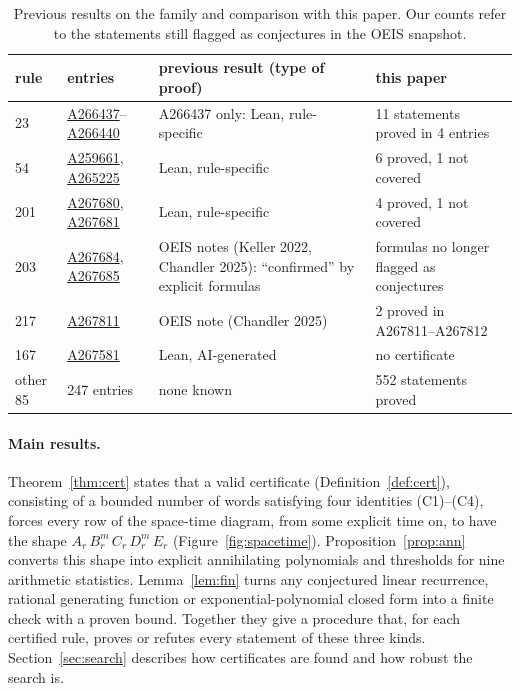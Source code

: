 \documentclass[11pt]{article}
\theoremstyle{definition}
\theoremstyle{remark}
\newcommand{\oeis}[1]{\href{https://oeis.org/#1}{#1}}
\begin{document}
\begin{table}[ht]\centering\small
\begin{tabular}{p{1.1cm}p{3.1cm}p{5.2cm}p{4.6cm}}\toprule
rule & entries & previous result (type of proof) & this paper\\\midrule
23 & \oeis{A266437}--\oeis{A266440} & A266437 only: Lean, rule-specific~\cite{blair} & 11 statements proved in 4 entries\\
54 & \oeis{A259661}, \oeis{A265225} & Lean, rule-specific~\cite{omega54} & 6 proved, 1 not covered\\
201 & \oeis{A267680}, \oeis{A267681} & Lean, rule-specific~\cite{omega} & 4 proved, 1 not covered\\
203 & \oeis{A267684}, \oeis{A267685} & OEIS notes (Keller 2022, Chandler 2025): ``confirmed'' by explicit formulas & formulas no longer flagged as conjectures\\
217 & \oeis{A267811} & OEIS note (Chandler 2025) & 2 proved in A267811--A267812\\
167 & \oeis{A267581} & Lean, AI-generated~\cite{adamczewski} & no certificate\\
other 85 & 247 entries & none known & 552 statements proved\\\bottomrule
\end{tabular}
\caption{Previous results on the family and comparison with this paper. Our counts refer to the statements still flagged as conjectures in the OEIS snapshot.}\label{tab:prior}
\end{table}

\paragraph{Main results.} Theorem~\ref{thm:cert} states that a valid certificate (Definition~\ref{def:cert}), consisting of a bounded number of words satisfying four identities (C1)--(C4), forces every row of the space-time diagram, from some explicit time on, to have the shape $A_r\,B_r^m\,C_r\,D_r^m\,E_r$ (Figure~\ref{fig:spacetime}). Proposition~\ref{prop:ann} converts this shape into explicit annihilating polynomials and thresholds for nine arithmetic statistics. Lemma~\ref{lem:fin} turns any conjectured linear recurrence, rational generating function or exponential-polynomial closed form into a finite check with a proven bound. Together they give a procedure that, for each certified rule, proves or refutes every statement of these three kinds. Section~\ref{sec:search} describes how certificates are found and how robust the search is.
\end{document}
